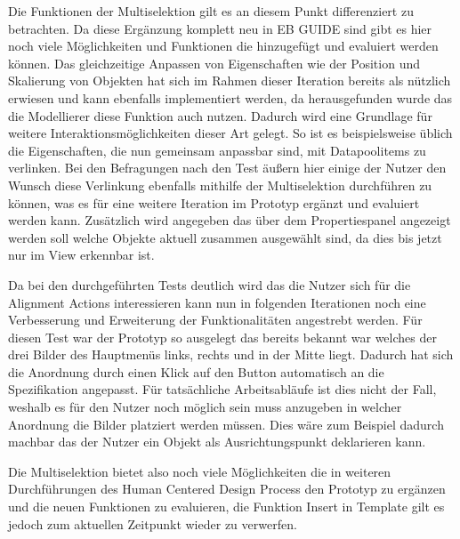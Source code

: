 Die Funktionen der Multiselektion gilt es an diesem Punkt differenziert zu betrachten.
Da diese Ergänzung komplett neu in EB GUIDE sind gibt es hier noch viele Möglichkeiten und Funktionen die hinzugefügt und evaluiert werden können.
Das gleichzeitige Anpassen von Eigenschaften wie der Position und Skalierung von Objekten hat sich im Rahmen dieser Iteration bereits als nützlich erwiesen und kann ebenfalls implementiert werden, da herausgefunden wurde das die Modellierer diese Funktion auch nutzen.
Dadurch wird eine Grundlage für weitere Interaktionsmöglichkeiten dieser Art gelegt.
So ist es beispielsweise üblich die Eigenschaften, die nun gemeinsam anpassbar sind, mit Datapoolitems zu verlinken.
Bei den Befragungen nach den Test äußern hier einige der Nutzer den Wunsch diese Verlinkung ebenfalls mithilfe der Multiselektion durchführen zu können, was es für eine weitere Iteration im Prototyp ergänzt und evaluiert werden kann.
Zusätzlich wird angegeben das über dem Propertiespanel angezeigt werden soll welche Objekte aktuell zusammen ausgewählt sind, da dies bis jetzt nur im View erkennbar ist.

Da bei den durchgeführten Tests deutlich wird das die Nutzer sich für die Alignment Actions interessieren kann nun in folgenden Iterationen noch eine Verbesserung und Erweiterung der Funktionalitäten angestrebt werden.
Für diesen Test war der Prototyp so ausgelegt das bereits bekannt war welches der drei Bilder des Hauptmenüs links, rechts und in der Mitte liegt.
Dadurch hat sich die Anordnung durch einen Klick auf den Button automatisch an die Spezifikation angepasst.
Für tatsächliche Arbeitsabläufe ist dies nicht der Fall, weshalb es für den Nutzer noch möglich sein muss anzugeben in welcher Anordnung die Bilder platziert werden müssen.
Dies wäre zum Beispiel dadurch machbar das der Nutzer ein Objekt als Ausrichtungspunkt deklarieren kann.

Die Multiselektion bietet also noch viele Möglichkeiten die in weiteren Durchführungen des Human Centered Design Process den Prototyp zu ergänzen und die neuen Funktionen zu evaluieren, die Funktion  \glqq Insert in Template\grqq{} gilt es jedoch zum aktuellen Zeitpunkt wieder zu verwerfen.